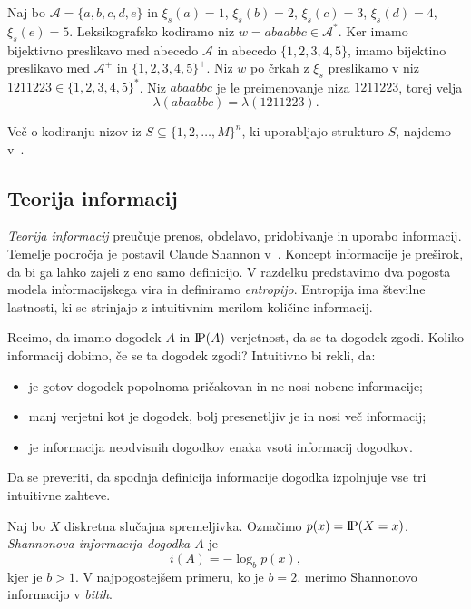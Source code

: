 \documentclass[fin1, tisk]{fmfdelo}
\newcommand{\probP}{\text{I\kern-0.15em P}}
\newcommand{\A}{\mathcal{A}}
\theoremstyle{definition}
\begin{document}
\begin{primer}\label{primer:preimenovanje}
    Naj bo $\A = \{ a, b, c, d, e \}$ in $\xi_s(a) = 1$, $\xi_s(b) = 2$, $\xi_s(c) = 3$, 
    $\xi_s(d) = 4$, $\xi_s(e) = 5$. Leksikografsko kodiramo niz $w = \textit{abaabbc} \in \A^*$.
    Ker imamo bijektivno preslikavo med abecedo $\A$ in abecedo $\{ 1, 2, 3, 4, 5\}$, imamo
    bijektino preslikavo med $\A^+$ in $\{ 1, 2, 3, 4, 5\}^+$. Niz $w$ po črkah z $\xi_s$ 
    preslikamo v niz $1211223 \in \{ 1, 2, 3, 4, 5 \}^*$. Niz $\textit{abaabbc}$ je le
    preimenovanje niza $1211223$, torej velja
    \[
        \lambda(\textit{abaabbc}) = \lambda(1211223).
    \]
\end{primer}

Več o kodiranju nizov iz $S \subseteq \{ 1,2, \ldots, M\}^n$, ki uporabljajo strukturo $S$, 
najdemo v~\cite{Cover1973}.

\subsection{Teorija informacij}

\emph{Teorija informacij} preučuje prenos, obdelavo, pridobivanje in uporabo informacij. Temelje
področja je postavil Claude Shannon v~\cite{Shannon1949}. Koncept informacije je preširok, da bi 
ga lahko zajeli z eno samo definicijo. V razdelku predstavimo dva pogosta modela
informacijskega vira in definiramo \emph{entropijo}. Entropija ima številne lastnosti, ki se 
strinjajo z intuitivnim merilom količine informacij.

Recimo, da imamo dogodek $A$ in $\probP(A)$ verjetnost, da se ta dogodek zgodi.
Koliko informacij dobimo, če se ta dogodek zgodi? Intuitivno bi rekli, da:
\begin{itemize}
    \item je gotov dogodek popolnoma pričakovan in ne nosi nobene informacije;
    \item manj verjetni kot je dogodek, bolj presenetljiv je in nosi več informacij;
    \item je informacija neodvisnih dogodkov enaka vsoti informacij dogodkov.
\end{itemize}
Da se preveriti, da spodnja definicija informacije dogodka izpolnjuje vse tri intuitivne zahteve.

\begin{definicija}
    Naj bo $X$ diskretna slučajna spremeljivka. Označimo $p(x) = \probP(X = x)$. 
    \emph{Shannonova informacija dogodka $A$} je
    \[
        i(A) = - \log_b p(x),
    \]
    kjer je $b > 1$. V najpogostejšem primeru, ko je $b=2$, merimo Shannonovo informacijo v 
    \emph{bitih}. 
\end{definicija}
\end{document}
